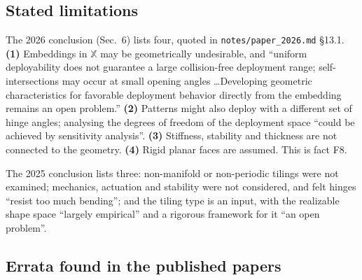 \documentclass[10pt,a4paper]{article}
\newcommand{\fn}[1]{\nolinkurl{#1}}
\begin{document}
\subsection{Stated limitations}

The 2026 conclusion (Sec.~6) lists four, quoted in \fn{notes/paper_2026.md} \S13.1.
\textbf{(1)} Embeddings in $\mathbb X$ may be geometrically undesirable, and ``uniform
deployability does not guarantee a large collision-free deployment range; self-intersections
may occur at small opening angles \dots Developing geometric characteristics for favorable
deployment behavior directly from the embedding remains an open problem.''
\textbf{(2)} Patterns might also deploy with a different set of hinge angles; analysing the
degrees of freedom of the deployment space ``could be achieved by sensitivity analysis''.
\textbf{(3)} Stiffness, stability and thickness are not connected to the geometry.
\textbf{(4)} Rigid planar faces are assumed. This is fact F8.

The 2025 conclusion lists three: non-manifold or non-periodic tilings were not examined;
mechanics, actuation and stability were not considered, and felt hinges ``resist too much
bending''; and the tiling type is an input, with the realizable shape space ``largely
empirical'' and a rigorous framework for it ``an open problem''.

\subsection{Errata found in the published papers}
\end{document}
